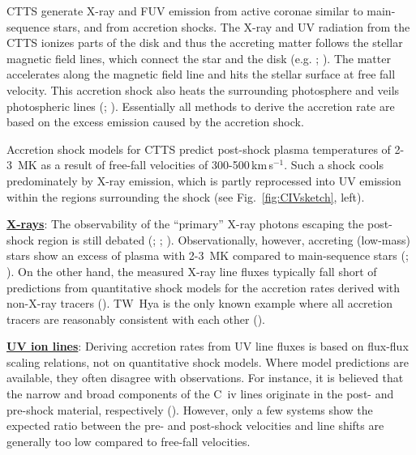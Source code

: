 \documentclass[letterpaper,11pt,twocolumn]{article}
\begin{document}
CTTS generate X-ray and FUV emission from active coronae similar to main-sequence stars, and from accretion shocks.
The X-ray and UV radiation from the CTTS ionizes parts of the disk and thus the accreting matter follows the stellar magnetic field lines, which connect the star and the disk (e.g. ; ). The matter accelerates along the magnetic field line and hits the stellar surface at free fall velocity.
This accretion shock also heats the surrounding photosphere and veils photospheric lines (; ). Essentially all methods to derive 
the accretion rate are based on the excess emission caused by the accretion shock. 

Accretion shock models for CTTS predict post-shock plasma
temperatures of 2-3~MK as a result of free-fall velocities of 
300-500\,km\,s$^{-1}$. Such a shock cools predominately by
X-ray emission, which is partly reprocessed into UV emission within the regions surrounding the shock (see Fig.~\ref{fig:CIVsketch}, left). 

\underline{\bf X-rays}: The observability of the ``primary'' X-ray photons 
escaping the post-shock region is still debated 
(; ; ). Observationally, 
however, accreting (low-mass) stars show  an excess of plasma with 2-3~MK
compared to main-sequence stars (; ).
On the other hand, the measured X-ray line fluxes typically fall short of
predictions from quantitative shock models for the accretion rates derived with non-X-ray tracers (). TW~Hya is the only known example where all accretion tracers are reasonably consistent with each other (). 


\underline{\bf UV ion lines}:  Deriving  accretion rates from UV line fluxes is based 
on flux-flux scaling relations, not on quantitative shock models. Where model predictions are available, they often disagree with observations. For instance, it is believed that the  narrow and 
broad components of the C~{\sc iv} lines  originate in the post- and 
pre-shock material, respectively (). However, only a few systems show the
expected ratio between the pre- and post-shock velocities and line
shifts are generally too low compared to free-fall velocities. 
\end{document}
